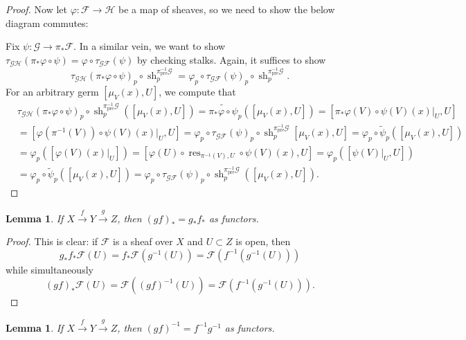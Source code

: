 \documentclass{article}
\newcommand{\fF}{\mathscr{F}}
\newcommand{\fG}{\mathscr{G}}
\newcommand{\fH}{\mathscr{H}}
\DeclareMathOperator{\pre}{pre}
\DeclareMathOperator{\res}{res}
\DeclareMathOperator{\Mor}{Mor}
\DeclareMathOperator{\sh}{sh}
\newtheorem{lemma}[theorem]{Lemma}
\begin{document}
\begin{proof}
    Now let $\varphi:\fF\to \fH$ be a map of sheaves, so we need to show the below diagram commutes:
    \begin{center}
    \end{center}
    Fix $\psi:\fG \to \pi_* \fF$. In a similar vein, we want to show $\tau_{\fG \fH} (\pi_* \varphi \circ \psi) = \varphi \circ \tau_{\fG \fF}(\psi)$ by checking stalks. Again, it suffices to show
    \[
    \tau_{\fG \fH} (\pi_* \varphi \circ \psi)_p \circ \sh^{\pi^{-1}_{\pre} \fG}_p = \varphi_p \circ \tau_{\fG \fF}(\psi)_p \circ \sh^{\pi^{-1}_{\pre} \fG}_p.
    \]
    For an arbitrary germ $[\mu_V(x),U]$, we compute that
    \begin{align*}
        &\tau_{\fG \fH} (\pi_* \varphi \circ \psi)_p \circ \sh^{\pi^{-1}_{\pre} \fG}_p([\mu_V(x),U])=\widetilde{\pi_* \varphi \circ \psi}_p([\mu_V(x),U])=[\pi_*\varphi(V)\circ \psi(V)(x)\vert_U,U]\\
        &=[\varphi(\pi^{-1}(V)) \circ \psi(V)(x)\vert_U,U]=\varphi_p\circ \tau_{\fG \fF}(\psi)_p\circ \sh_p^{\pi^{-1}_{\pre}\fG}[\mu_V(x),U]=\varphi_p \circ \tilde \psi_p([\mu_V(x),U])\\
        &= \varphi_p([\varphi(V)(x)\vert_U])=[\varphi(U)\circ \res_{\pi^{-1}(V),U}\circ \psi(V)(x),U]=\varphi_p([\psi(V)\vert_U,U])\\
        &=\varphi_p\circ \tilde \psi_p([\mu_V(x),U])=\varphi_p \circ \tau_{\fG \fF}(\psi)_p \circ \sh^{\pi^{-1}_{\pre} \fG}_p([\mu_V(x),U]).
    \end{align*}
\end{proof}
\begin{lemma} \label{lem:pushforward sheaf distributes}
        If $X\xrightarrow{f}Y\xrightarrow{g}Z$, then $(gf)_* = g_*f_*$ as functors.
    \end{lemma}
    \begin{proof}
        This is clear: if $\fF$ is a sheaf over $X$ and $U\subset Z$ is open, then
        \[
        g_*f_*\fF(U)=f_* \fF(g^{-1}(U))=\fF(f^{-1}(g^{-1}(U)))
        \]
        while simultaneously
        \[
        (gf)_*\fF(U)=\fF((gf)^{-1}(U))=\fF(f^{-1}(g^{-1}(U))).
        \]
    \end{proof}
    \begin{lemma} \label{lem:inverse image sheaf distributes}
        If $X\xrightarrow{f}Y\xrightarrow{g}Z$, then $(gf)^{-1} = f^{-1}g^{-1}$ as functors.
    \end{lemma}
\end{document}
